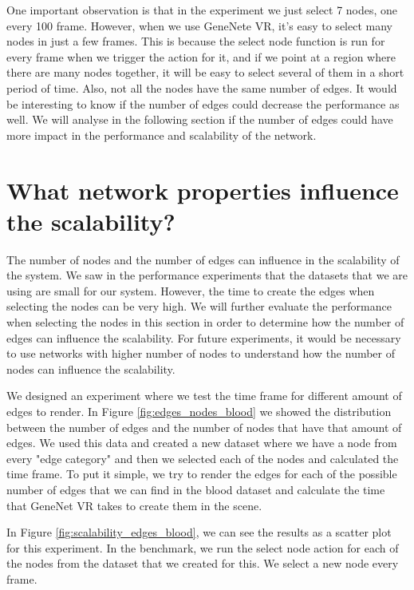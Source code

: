 One important observation is that in the experiment we just select 7 nodes, one every 100 frame. However, when we use GeneNete VR, it's easy to select many nodes in just a few frames. This is because the select node function is run for every frame when we trigger the action for it, and if we point at a region where there are many nodes together, it will be easy to select several of them in a short period of time. Also, not all the nodes have the same number of edges. It would be interesting to know if the number of edges could decrease the performance as well. We will analyse in the following section if the number of edges could have more impact in the performance and scalability of the network.

\section{What network properties influence the scalability?}

The number of nodes and the number of edges can influence in the scalability of the system. We saw in the performance experiments that the datasets that we are using are small for our system. However, the time to create the edges when selecting the nodes can be very high. We will further evaluate the performance when selecting the nodes in this section in order to determine how the number of edges can influence the scalability. For future experiments, it would be necessary to use networks with higher number of nodes to understand how the number of nodes can influence the scalability.

We designed an experiment where we test the time frame for different amount of edges to render. In Figure \ref{fig:edges_nodes_blood} we showed the distribution between the number of edges and the number of nodes that have that amount of edges. We used this data and created a new dataset where we have a node from every "edge category" and then we selected each of the nodes and calculated the time frame. To put it simple, we try to render the edges for each of the possible number of edges that we can find in the blood dataset and calculate the time that GeneNet VR takes to create them in the scene.

In Figure \ref{fig:scalability_edges_blood}, we can see the results as a scatter plot for this experiment. In the benchmark, we run the select node action for each of the nodes from the dataset that we created for this. We select a new node every frame.

